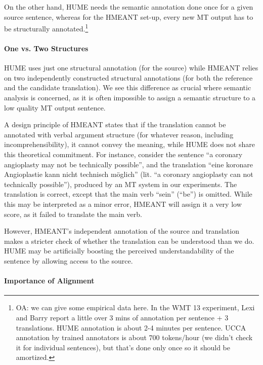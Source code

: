 \documentclass[11pt]{article}
\newcommand{\oa}[1]{\footnote{\color{red}OA: #1}}
\begin{document}
On the other hand, HUME 
needs the semantic annotation
done once for a given source sentence, whereas for the HMEANT set-up, every new
MT output has to be structurally annotated.\oa{we can give some empirical data here.
  In the WMT 13 experiment, Lexi and Barry report a little over 3 mins of annotation
  per sentence + 3 translations. HUME annotation is about 2-4 minutes per sentence.
  UCCA annotation by trained annotators is about 700 tokens/hour (we didn't
  check it for individual sentences), but that's done only once so it should be amortized.}

\paragraph{One vs. Two Structures}

HUME uses just one structural annotation (for the source) while HMEANT relies on
two independently constructed structural annotations (for both the reference and
the candidate translation).
We see this difference as crucial where semantic analysis is concerned, as it
is often impossible to assign a semantic structure to a low quality MT output sentence.

A design principle of HMEANT states that
if the translation cannot be annotated with verbal argument structure
(for whatever reason, including incomprehensibility), it cannot convey the meaning,
while HUME does not share this theoretical commitment.
For instance, consider the sentence ``a coronary angioplasty may not be technically possible'',
and the translation ``eine koronare Angioplastie kann nicht technisch m{\"o}glich''
(lit. ``a coronary angioplasty can not technically possible''),
produced by an MT system in our experiments.
The translation is correct, except that the main verb ``sein'' (``be'') is omitted.
While this may be interpreted as a minor error, HMEANT will assign it a very low score,
as it failed to translate the main verb.

However, HMEANT's independent annotation of the source and translation makes a stricter check
of whether the translation can be understood
than we do. HUME may be artificially boosting the perceived understandability of
the sentence by allowing access to the source.

\paragraph{Importance of Alignment}
\end{document}
